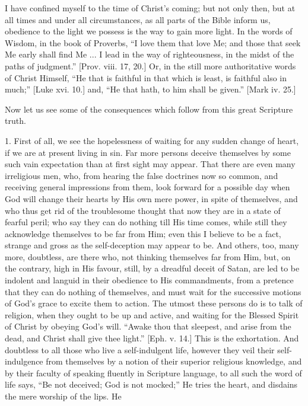 I have confined myself to the time of Christ's coming; but not only
then, but at all times and under all circumstances, as all parts of
the Bible inform us, obedience to the light we possess is the way to
gain more light. In the words of Wisdom, in the book of Proverbs,
``I love them that love Me; and those that seek Me early shall
find Me ... I lead in the way of righteousness, in the midst of the
paths of judgment.'' [Prov. viii. 17, 20.] Or, in the still more
authoritative words of Christ Himself, ``He that is faithful in
that which is least, is faithful also in much;'' [Luke xvi. 10.]
and, ``He that hath, to him shall be given.'' [Mark iv. 25.]

Now let us see some of the consequences which follow from this
great Scripture truth.

1. First of all, we see the hopelessness of waiting for any sudden
change of heart, if we are at present living in sin. Far more persons
deceive themselves by some such vain expectation than at first sight
may appear. That there are even many irreligious men, who, from
hearing the false doctrines now so common, and receiving general
impressions from them, look forward for a possible day when God will
change their hearts by His own mere power, in spite of themselves, and
who thus get rid of the troublesome thought that now they are in a
state of fearful peril; who say they can do nothing till His time
comes, while still they acknowledge themselves to be far from Him;
even this I believe to be a fact, strange and gross as the
self-deception may appear to be. And others, too, many more,
doubtless, are there who, not thinking themselves far from Him, but,
on the contrary, high in His favour, still, by a dreadful deceit of
Satan, are led to be indolent and languid in their obedience to His
commandments, from a pretence that they can do nothing of themselves,
and must wait for the successive motions of God's grace to excite them
to action. The utmost these persons do is to talk of religion, when
they ought to be up and active, and waiting for the Blessed Spirit of
Christ by obeying God's will. ``Awake thou that sleepest, and
arise from the dead, and Christ shall give thee light.'' [Eph. v.
14.] This is the exhortation. And doubtless to all those who live a
self-indulgent life, however they veil their self-indulgence from
themselves by a notion of their superior religious knowledge, and by
their faculty of speaking fluently in Scripture language, to all such
the word of life says, ``Be not deceived; God is not mocked;''
He tries the heart, and disdains the mere worship of the lips. He

